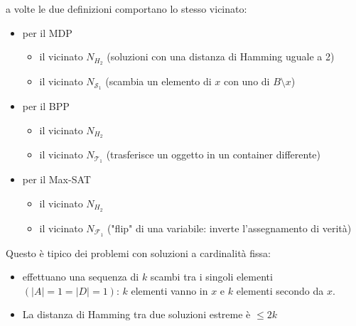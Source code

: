 \documentclass{article}
\begin{document}
a volte le due definizioni comportano lo stesso vicinato:
\begin{itemize}
    \item per il MDP
          \begin{itemize}
              \item il vicinato $N_{H_2}$ (soluzioni con una distanza di Hamming uguale a 2)
              \item il vicinato $N_{\mathcal{S}_1}$ (scambia un elemento di $x$ con uno di $B\setminus x$)
          \end{itemize}
    \item per il BPP
          \begin{itemize}
              \item il vicinato $N_{H_2}$
              \item il vicinato $N_{\mathcal{T}_1}$ (trasferisce un oggetto in un container differente)
          \end{itemize}
    \item per il Max-SAT
          \begin{itemize}
              \item il vicinato $N_{H_2}$
              \item il vicinato $N_{\mathcal{F}_1}$ ("flip" di una variabile: inverte l'assegnamento di verità)
          \end{itemize}
\end{itemize}

Questo è tipico dei problemi con soluzioni a cardinalità fissa:
\begin{itemize}
    \item effettuano una sequenza di $k$ scambi tra i singoli elementi $(|A|=1=|D|=1)$: $k$
          elementi vanno in $x$ e $k$ elementi secondo da $x$.
    \item La distanza di Hamming tra due soluzioni estreme è $\leq 2k$
\end{itemize}
\end{document}
